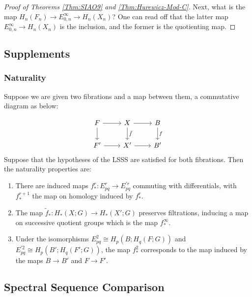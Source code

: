 \documentclass[reqno]{amsart}
\theoremstyle{definition}
\theoremstyle{remark}
\begin{document}
\begin{proof}[Proof of Theorems
    \ref{Thm:SIAO9} and \ref{Thm:Hurewicz-Mod-C}]
     Next, what is the map
     $H_n(F_n) \to E_{0,n}^{\infty} \to 
     H_n(X_n)$?
     One can read off that the
     latter map $E_{0,n}^{\infty} \to H_n(X_n)$ is the
     inclusion, and the former is the quotienting map.
     


\end{proof}











\subsection{Supplements}

\subsubsection{Naturality}

Suppose we are given two fibrations
and a map between them, a commutative diagram as
below:

\begin{equation*}
\begin{tikzcd}
    F \ar[r] \ar[d] & X \ar[r] \ar[d, "\tilde{f}"] &
    B \ar[d, "f"] \\
    F' \ar[r] & X' \ar[r] & B'
\end{tikzcd}
\end{equation*}
Suppose that the hypotheses of the LSSS are satisfied
for both fibrations. Then the naturality properties are:
\begin{enumerate}
    \item There are induced maps
        $f_*^{r} \colon E_{pq}^{r} \to 
        E_{pq}^{'r}$ commuting with differentials, with
        $f_*^{r+1}$ the map on homology induced by
        $f_*^{r}$.
    \item The map $\tilde{f}_* \colon
        H_* (X;G) \to H_* (X';G)$ preserves filtrations,
        inducing a map on successive quotient groups
        which is the map $f_*^{\infty}$.
    \item Under the isomorphisms
        $E_{pq}^2 \cong
        H_p (B; H_q(F;G))$ and
        $E_{pq}^{'2} \cong
        H_p (B'; H_q(F';G))$, the map
        $f_*^2$ corresponds to the map induced by
        the maps $B \to B'$ and $F \to F'$.
\end{enumerate}

\subsection{Spectral Sequence Comparison}
\end{document}
